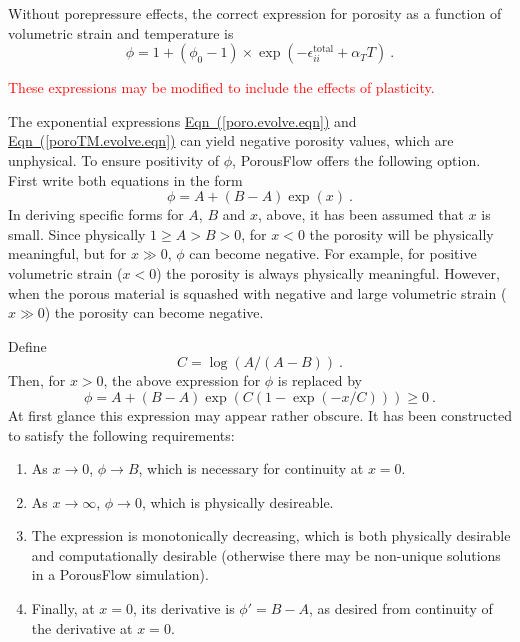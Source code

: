 \documentclass[12pt]{report}
\begin{document}
Without porepressure effects, the correct expression for porosity as a
function of volumetric strain and temperature is
\begin{equation}
\phi = 1 + (\phi_{0} - 1)\times \exp \left(-
\epsilon^{\mathrm{total}}_{ii} + \alpha_{T}T \right) \ .
\label{poroTM.evolve.eqn}
\end{equation}

\textcolor{red}{These expressions may be modified to include the
  effects of plasticity.}

The exponential expressions
\hyperref[poro.evolve.eqn]{Eqn~(\ref*{poro.evolve.eqn})} and
\hyperref[poroTM.evolve.eqn]{Eqn~(\ref*{poroTM.evolve.eqn})} can yield
negative porosity values, which are unphysical.  To ensure positivity
of $\phi$, PorousFlow offers the following option.  First write both
equations in the form
\begin{equation}
\phi = A + (B - A) \exp(x) \ .
\end{equation}
In deriving specific forms for $A$, $B$ and $x$, above, it has been
assumed that $x$ is small.  Since physically $1\geq A > B > 0$, for
$x<0$ the porosity will be physically meaningful, but for $x\gg 0$,
$\phi$ can become negative.  For example, for positive volumetric
strain ($x<0$) the porosity is always physically meaningful.  However,
when the porous material is squashed with negative and large
volumetric strain ($x\gg 0$) the porosity can become negative.

Define
\begin{equation}
C = \log(A/(A-B)) \ .
\end{equation}
Then, for $x>0$, the above expression for $\phi$ is replaced by
\begin{equation}
\phi = A + (B - A) \exp\left(C (1 - \exp(-x/C)) \right)  \geq 0 \ .
\end{equation}
At first glance this expression may appear rather obscure.  It has
been constructed to satisfy the following requirements:
\begin{enumerate}
\item As $x\rightarrow 0$, $\phi\rightarrow B$, which is necessary for
continuity at $x=0$.  
\item As $x\rightarrow\infty$, $\phi\rightarrow 0$, which is
  physically desireable.
\item The expression is monotonically decreasing, which is both
  physically desirable and computationally desirable (otherwise there
  may be non-unique solutions in a PorousFlow simulation).
\item Finally, at $x=0$,
its derivative is $\phi' = B - A$, as desired from continuity of the
derivative at $x=0$.
\end{enumerate}
\end{document}

